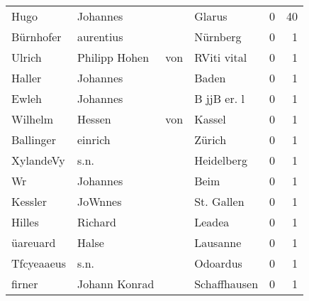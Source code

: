 \begin{tabular}{llllrr}
                     Hugo &                           Johannes &             &                                      Glarus &          0 &        40 \\
                Bürnhofer &                          aurentius &             &                                    Nürnberg &          0 &         1 \\
                   Ulrich &                     Philipp  Hohen &         von &                                 RViti vital &          0 &         1 \\
                   Haller &                           Johannes &             &                                       Baden &          0 &         1 \\
                    Ewleh &                           Johannes &             &                                 B jjB er. l &          0 &         1 \\
                  Wilhelm &                             Hessen &         von &                                      Kassel &          0 &         1 \\
                Ballinger &                            einrich &             &                                      Zürich &          0 &         1 \\
                XylandeVy &                               s.n. &             &                                  Heidelberg &          0 &         1 \\
                       Wr &                           Johannes &             &                                        Beim &          0 &         1 \\
                  Kessler &                            JoWnnes &             &                                  St. Gallen &          0 &         1 \\
                   Hilles &                            Richard &             &                                      Leadea &          0 &         1 \\
                 üareuard &                              Halse &             &                                    Lausanne &          0 &         1 \\
               Tfcyeaaeus &                               s.n. &             &                                    Odoardus &          0 &         1 \\
                   firner &                      Johann Konrad &             &                                Schaffhausen &          0 &         1 \\

\end{tabular}
